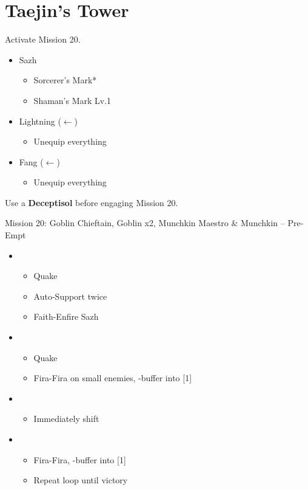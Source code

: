 \chapter{Taejin's Tower}

Activate Mission 20.

\begin{menu}
	\begin{itemize}
		\equip
		\begin{itemize}
			\item Sazh
				\begin{itemize}
					\item Sorcerer's Mark*
					\item Shaman's Mark Lv.1
				\end{itemize}
			\item Lightning ($\leftarrow$)
				\begin{itemize}
					\item Unequip everything
				\end{itemize}
			\item Fang ($\leftarrow$)
				\begin{itemize}
					\item Unequip everything
				\end{itemize}
		\end{itemize}
	\end{itemize}
\end{menu}

Use a \textbf{Deceptisol} before engaging Mission 20.

\begin{battle}{{Mission 20: Goblin Chieftain, Goblin x2, Munchkin Maestro \& Munchkin -- Pre-Empt}}
	\begin{itemize}
		\item \third
			\begin{itemize}
				\item Quake
				\item Auto-Support twice
				\item Faith-Enfire Sazh
			\end{itemize}
		\item \fifth
			\begin{itemize}
				\item Quake
				\item Fira-Fira on small enemies, \com-buffer into [1]
			\end{itemize}
		\item \first
			\begin{itemize}
				\item Immediately shift
			\end{itemize}
		\item \fifth
			\begin{itemize}
				\item Fira-Fira, \com-buffer into [1]
				\item Repeat loop until victory
			\end{itemize}
	\end{itemize}
\end{battle}

